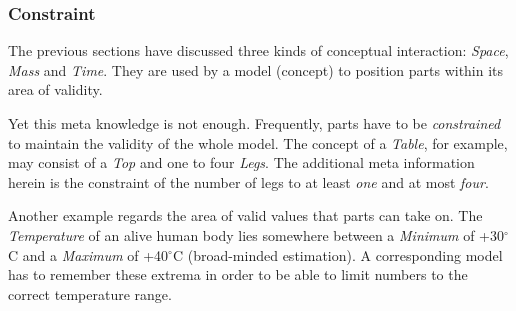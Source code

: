 %
%
%
%
%
%
%

\subsubsection{Constraint}
\label{constraint_heading}

The previous sections have discussed three kinds of conceptual interaction:
\emph{Space}, \emph{Mass} and \emph{Time}. They are used by a model (concept)
to position parts within its area of validity.

Yet this meta knowledge is not enough. Frequently, parts have to be
\emph{constrained} to maintain the validity of the whole model. The concept of
a \emph{Table}, for example, may consist of a \emph{Top} and one to four
\emph{Legs}. The additional meta information herein is the constraint of the
number of legs to at least \emph{one} and at most \emph{four}.

Another example regards the area of valid values that parts can take on. The
\emph{Temperature} of an alive human body lies somewhere between a
\emph{Minimum} of +30$^{\circ}$C and a \emph{Maximum} of +40$^{\circ}$C
(broad-minded estimation). A corresponding model has to remember these extrema
in order to be able to limit numbers to the correct temperature range.
